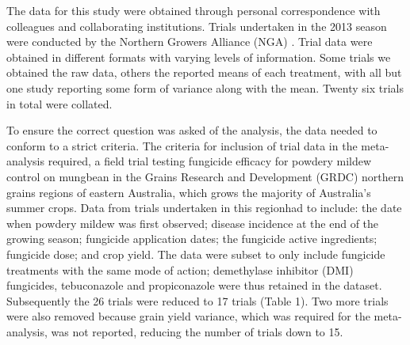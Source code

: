 \documentclass[agronomy,article,submit,moreauthors,pdftex]{mdpi}
\begin{document}
The data for this study were obtained through personal correspondence
with colleagues and collaborating institutions. Trials undertaken in the
2013 season were conducted by the Northern Growers Alliance (NGA)
\citetext{\citeyear{goolhi2013}; \citeyear{premer2013}; \citeyear{Millmerran2013}; \citeyear{Marysmount2013}}.
Trial data were obtained in different formats with varying levels of
information. Some trials we obtained the raw data, others the reported
means of each treatment, with all but one study reporting some form of
variance along with the mean. Twenty six trials in total were collated.

To ensure the correct question was asked of the analysis, the data
needed to conform to a strict criteria. The criteria for inclusion of
trial data in the meta-analysis required, a field trial testing
fungicide efficacy for powdery mildew control on mungbean in the Grains
Research and Development (GRDC) northern grains regions of eastern
Australia, which grows the majority of Australia's summer crops. Data
from trials undertaken in this regionhad to include: the date when
powdery mildew was first observed; disease incidence at the end of the
growing season; fungicide application dates; the fungicide active
ingredients; fungicide dose; and crop yield. The data were subset to
only include fungicide treatments with the same mode of action;
demethylase inhibitor (DMI) fungicides, tebuconazole and propiconazole
were thus retained in the dataset. Subsequently the 26 trials were
reduced to 17 trials (Table 1). Two more trials were also removed
because grain yield variance, which was required for the meta-analysis,
was not reported, reducing the number of trials down to 15.
\end{document}
